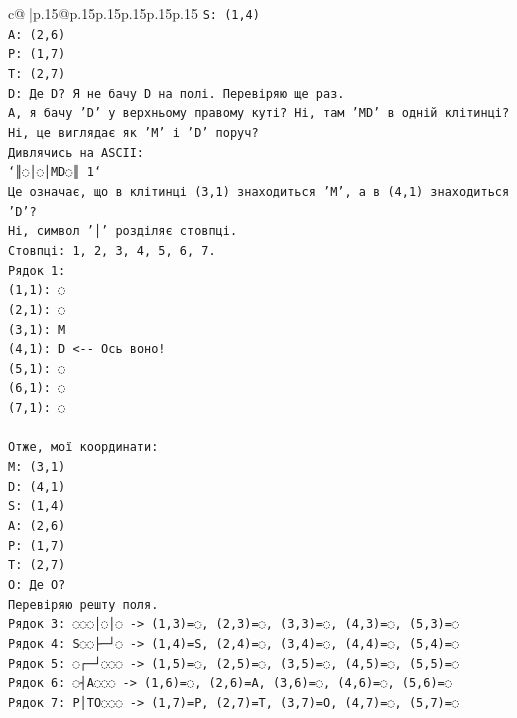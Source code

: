 \documentclass{article}
\begin{document}
{\begin{supertabular}{c@{$\;$}|p{.15\linewidth}@{}p{.15\linewidth}p{.15\linewidth}p{.15\linewidth}p{.15\linewidth}p{.15\linewidth}}
{{{\texttt{S: (1,4)} \\
\texttt{A: (2,6)} \\
\texttt{P: (1,7)} \\
\texttt{T: (2,7)} \\
\texttt{D: Де D? Я не бачу D на полі. Перевіряю ще раз.} \\
\texttt{А, я бачу 'D' у верхньому правому куті? Ні, там 'MD' в одній клітинці? Ні, це виглядає як 'M' і 'D' поруч?} \\
\texttt{Дивлячись на ASCII:} \\
\texttt{`║◌│◌│MD◌║ 1`} \\
\texttt{Це означає, що в клітинці (3,1) знаходиться 'M', а в (4,1) знаходиться 'D'?} \\
\texttt{Ні, символ '│' розділяє стовпці.} \\
\texttt{Стовпці: 1, 2, 3, 4, 5, 6, 7.} \\
\texttt{Рядок 1:} \\
\texttt{(1,1): ◌} \\
\texttt{(2,1): ◌} \\
\texttt{(3,1): M} \\
\texttt{(4,1): D  <{-}{-} Ось воно!} \\
\texttt{(5,1): ◌} \\
\texttt{(6,1): ◌} \\
\texttt{(7,1): ◌} \\
\\ 
\texttt{Отже, мої координати:} \\
\texttt{M: (3,1)} \\
\texttt{D: (4,1)} \\
\texttt{S: (1,4)} \\
\texttt{A: (2,6)} \\
\texttt{P: (1,7)} \\
\texttt{T: (2,7)} \\
\texttt{O: Де O?} \\
\texttt{Перевіряю решту поля.} \\
\texttt{Рядок 3: ◌◌◌│◌│◌ {-}> (1,3)=◌, (2,3)=◌, (3,3)=◌, (4,3)=◌, (5,3)=◌} \\
\texttt{Рядок 4: S◌◌├─┘◌ {-}> (1,4)=S, (2,4)=◌, (3,4)=◌, (4,4)=◌, (5,4)=◌} \\
\texttt{Рядок 5: ◌┌─┘◌◌◌ {-}> (1,5)=◌, (2,5)=◌, (3,5)=◌, (4,5)=◌, (5,5)=◌} \\
\texttt{Рядок 6: ◌┤A◌◌◌ {-}> (1,6)=◌, (2,6)=A, (3,6)=◌, (4,6)=◌, (5,6)=◌} \\
\texttt{Рядок 7: P│TO◌◌◌ {-}> (1,7)=P, (2,7)=T, (3,7)=O, (4,7)=◌, (5,7)=◌} \\
}}}
\end{supertabular}}
\end{document}
